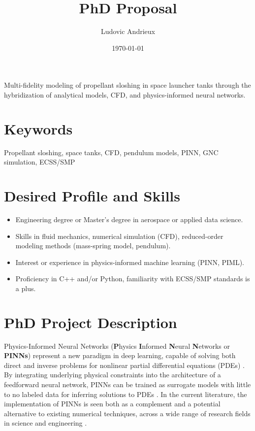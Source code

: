 \documentclass[12pt]{article}
\title{PhD Proposal}
\author{Ludovic Andrieux}
\date{\today}
\begin{document}
	\maketitle
	
	\begin{tcolorbox}[colback=gray!0, colframe=black, sharp corners, boxrule=0.5pt]
		Multi-fidelity modeling of propellant sloshing in space launcher tanks through the hybridization of analytical models, CFD, and physics-informed neural networks.
	\end{tcolorbox}
	
	\section*{Keywords}
	
	Propellant sloshing, space tanks, CFD, pendulum models, PINN, GNC simulation, ECSS/SMP
	
	\section*{Desired Profile and Skills}
	
	\begin{itemize}
		\item Engineering degree or Master's degree in aerospace or applied data science.
		
		\item Skills in fluid mechanics, numerical simulation (CFD), reduced-order modeling methods (mass-spring model, pendulum).
		
		\item Interest or experience in physics-informed machine learning (PINN, PIML).
		
		\item Proficiency in C++ and/or Python, familiarity with ECSS/SMP standards is a plus.
	\end{itemize}
	
	\section*{PhD Project Description}
	
	Physics-Informed Neural Networks (\textbf{P}hysics \textbf{I}nformed \textbf{N}eural \textbf{N}etworks or \textbf{PINNs}) represent a new paradigm in deep learning, capable of solving both direct and inverse problems for nonlinear partial differential equations (PDEs) \cite{raissiPhysicsinformedNeuralNetworks2019}. By integrating underlying physical constraints into the architecture of a feedforward neural network, PINNs can be trained as surrogate models with little to no labeled data for inferring solutions to PDEs \cite{cuomoScientificMachineLearning2022}. In the current literature, the implementation of PINNs is seen both as a complement and a potential alternative to existing numerical techniques, across a wide range of research fields in science and engineering \cite{maoPhysicsinformedNeuralNetworks2020, buosoPersonalisingLeftventricularBiophysical2021, caiPhysicsInformedNeuralNetworks2021}.
	
\end{document}
